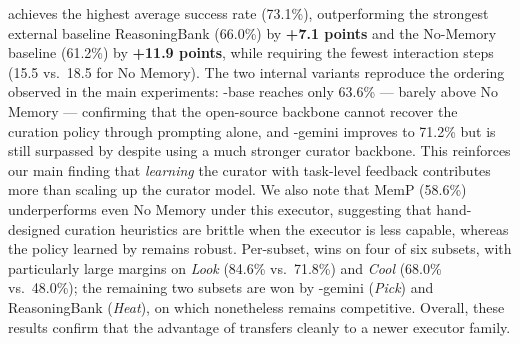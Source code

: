 \ours{} achieves the highest average success rate (73.1\%), outperforming the strongest external baseline ReasoningBank (66.0\%) by \textbf{+7.1 points} and the No-Memory baseline (61.2\%) by \textbf{+11.9 points}, while requiring the fewest interaction steps (15.5 vs.\ 18.5 for No Memory). The two internal variants reproduce the ordering observed in the main experiments: \ours{}-base reaches only 63.6\% — barely above No Memory — confirming that the open-source backbone cannot recover the curation policy through prompting alone, and \ours{}-gemini improves to 71.2\% but is still surpassed by \ours{} despite using a much stronger curator backbone. This reinforces our main finding that \emph{learning} the curator with task-level feedback contributes more than scaling up the curator model. We also note that MemP (58.6\%) underperforms even No Memory under this executor, suggesting that hand-designed curation heuristics are brittle when the executor is less capable, whereas the policy learned by \ours{} remains robust. Per-subset, \ours{} wins on four of six subsets, with particularly large margins on \textit{Look} (84.6\% vs.\ 71.8\%) and \textit{Cool} (68.0\% vs.\ 48.0\%); the remaining two subsets are won by \ours{}-gemini (\textit{Pick}) and ReasoningBank (\textit{Heat}), on which \ours{} nonetheless remains competitive. Overall, these results confirm that the advantage of \ours{} transfers cleanly to a newer executor family.

